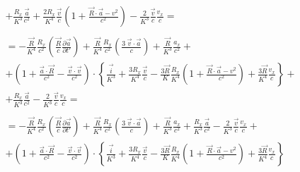 \documentclass[11pt]{article}
\begin{document}
\begin{align}
 & +\frac{{{R}_{x}}}{{{K}^{3}}}\frac{\overrightarrow{a}}{{{c}^{2}}}+\frac{2{{R}_{x}}}{{{K}^{4}}}\frac{\overrightarrow{v}}{c}\left( 1+\frac{\overrightarrow{R}\cdot \overrightarrow{a}-{{v}^{2}}}{{{c}^{2}}} \right)-\frac{2}{{{K}^{3}}}\frac{\overrightarrow{v}}{c}\frac{{{v}_{x}}}{c}= \\ 
 &  \\ 
 & =-\frac{\overrightarrow{R}}{{{K}^{4}}}\frac{{{R}_{x}}}{{{c}^{2}}}\left( \frac{\overrightarrow{R}}{c}\frac{\partial \overrightarrow{a}}{\partial t'} \right)+\frac{\overrightarrow{R}}{{{K}^{4}}}\frac{{{R}_{x}}}{{{c}^{2}}}\left( \frac{3\ \overrightarrow{v}\cdot \overrightarrow{a}}{c} \right)+\frac{\overrightarrow{R}}{{{K}^{3}}}\frac{{{a}_{x}}}{{{c}^{2}}}+ \\ 
 & +\left( 1+\frac{\overrightarrow{a}\cdot \overrightarrow{R}}{{{c}^{2}}}-\frac{\overrightarrow{v}\cdot \overrightarrow{v}}{{{c}^{2}}} \right)\cdot \left\{ \frac{\overrightarrow{i}}{{{K}^{3}}}+\frac{3{{R}_{x}}}{{{K}^{4}}}\frac{\overrightarrow{v}}{c}-\frac{3\overrightarrow{R}}{K}\frac{{{R}_{x}}}{{{K}^{4}}}\left( 1+\frac{\overrightarrow{R}\cdot \overrightarrow{a}-{{v}^{2}}}{{{c}^{2}}} \right)+\frac{3\overrightarrow{R}}{{{K}^{4}}}\frac{{{v}_{x}}}{c} \right\}+ \\ 
 & +\frac{{{R}_{x}}}{{{K}^{3}}}\frac{\overrightarrow{a}}{{{c}^{2}}}-\frac{2}{{{K}^{3}}}\frac{\overrightarrow{v}}{c}\frac{{{v}_{x}}}{c}= \\ 
 &  \\ 
 & =-\frac{\overrightarrow{R}}{{{K}^{4}}}\frac{{{R}_{x}}}{{{c}^{2}}}\left( \frac{\overrightarrow{R}}{c}\frac{\partial \overrightarrow{a}}{\partial t'} \right)+\frac{\overrightarrow{R}}{{{K}^{4}}}\frac{{{R}_{x}}}{{{c}^{2}}}\left( \frac{3\ \overrightarrow{v}\cdot \overrightarrow{a}}{c} \right)+\frac{\overrightarrow{R}}{{{K}^{3}}}\frac{{{a}_{x}}}{{{c}^{2}}}+\frac{{{R}_{x}}}{{{K}^{3}}}\frac{\overrightarrow{a}}{{{c}^{2}}}-\frac{2}{{{K}^{3}}}\frac{\overrightarrow{v}}{c}\frac{{{v}_{x}}}{c}+ \\ 
 & +\left( 1+\frac{\overrightarrow{a}\cdot \overrightarrow{R}}{{{c}^{2}}}-\frac{\overrightarrow{v}\cdot \overrightarrow{v}}{{{c}^{2}}} \right)\cdot \left\{ \frac{\overrightarrow{i}}{{{K}^{3}}}+\frac{3{{R}_{x}}}{{{K}^{4}}}\frac{\overrightarrow{v}}{c}-\frac{3\overrightarrow{R}}{K}\frac{{{R}_{x}}}{{{K}^{4}}}\left( 1+\frac{\overrightarrow{R}\cdot \overrightarrow{a}-{{v}^{2}}}{{{c}^{2}}} \right)+\frac{3\overrightarrow{R}}{{{K}^{4}}}\frac{{{v}_{x}}}{c} \right\} \\ 
 &  \\ 
\end{align}
\end{document}
